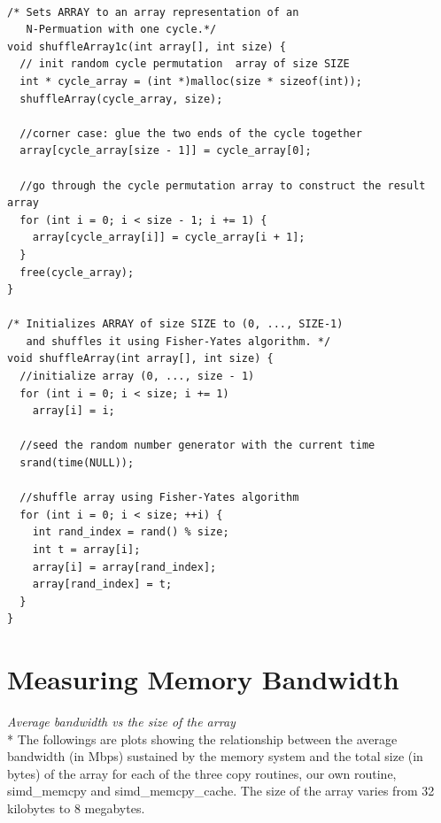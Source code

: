 \documentclass[11pt,letter]{article}
\begin{document}
\begin{lstlisting}[label=some-code,caption=Random Permutation with 1 cycle]

/* Sets ARRAY to an array representation of an                                  
   N-Permuation with one cycle.*/
void shuffleArray1c(int array[], int size) {
  // init random cycle permutation  array of size SIZE
  int * cycle_array = (int *)malloc(size * sizeof(int));
  shuffleArray(cycle_array, size);
  
  //corner case: glue the two ends of the cycle together
  array[cycle_array[size - 1]] = cycle_array[0];

  //go through the cycle permutation array to construct the result array
  for (int i = 0; i < size - 1; i += 1) {
    array[cycle_array[i]] = cycle_array[i + 1];
  }
  free(cycle_array);
}

/* Initializes ARRAY of size SIZE to (0, ..., SIZE-1)   
   and shuffles it using Fisher-Yates algorithm. */
void shuffleArray(int array[], int size) {
  //initialize array (0, ..., size - 1)
  for (int i = 0; i < size; i += 1)
    array[i] = i;

  //seed the random number generator with the current time
  srand(time(NULL));

  //shuffle array using Fisher-Yates algorithm
  for (int i = 0; i < size; ++i) {
    int rand_index = rand() % size;
    int t = array[i];
    array[i] = array[rand_index];
    array[rand_index] = t;
  }
}
\end{lstlisting}


\section{Measuring Memory Bandwidth}

\noindent\emph{Average bandwidth vs the size of the array}\\*
The followings are plots showing the relationship between the average bandwidth (in Mbps) sustained by the memory system and the total size (in bytes) of the array for each of the three copy routines, our own routine, simd\_memcpy and simd\_memcpy\_cache. The size of the array varies  from 32 kilobytes to 8 megabytes. 
\end{document}
